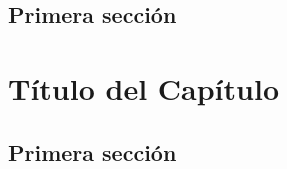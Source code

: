 \documentclass[12pt,a4paper,oneside,]{book}
\def\ifdoblecara{} %
\let\ifdoblecara\undefined %
\def\ifprincipal{} %
\numberwithin{dummy}{section}
\theoremstyle{ocrenumbox}
\theoremstyle{blacknumex}
\theoremstyle{blacknumbox}
\theoremstyle{ocrenum}
\theoremstyle{ocrenum}
\begin{document}
\hypertarget{primera-secciuxf3n-1}{%
\section{Primera sección}\label{primera-secciuxf3n-1}}

\FloatBarrier

\ifdefined\ifprincipal
\else
\setlength{\parindent}{1em}
\pagestyle{fancy}
\setcounter{tocdepth}{4}
\tableofcontents

\nocite{Luque2017,Luque2019,RStudio,R-base2,
R-knitr,R-rmarkdown,R-dplyr,R-ggplot2,Techopedia}

\fi

\ifdefined\ifdoblecara
\fancyhead{}{}
\fancyhead[LE,RO]{\scriptsize\rightmark}
\fancyfoot[LO,RE]{\scriptsize\slshape \leftmark}
\fancyfoot[C]{}
\fancyfoot[LE,RO]{\footnotesize\thepage}
\else
\fancyhead{}{}
\fancyhead[RO]{\scriptsize\rightmark}
\fancyfoot[LO]{\scriptsize\slshape \leftmark}
\fancyfoot[C]{}
\fancyfoot[RO]{\footnotesize\thepage}
\fi

\renewcommand{\headrulewidth}{0.4pt}
\renewcommand{\footrulewidth}{0.4pt}

\hypertarget{tuxedtulo-del-capuxedtulo-2}{%
\chapter{Título del Capítulo}\label{tuxedtulo-del-capuxedtulo-2}}

\hypertarget{primera-secciuxf3n-2}{%
\section{Primera sección}\label{primera-secciuxf3n-2}}

\FloatBarrier

\ifdefined\ifprincipal
\else
\setlength{\parindent}{1em}
\pagestyle{fancy}
\setcounter{tocdepth}{4}
\tableofcontents

\nocite{Luque2017,Luque2019,RStudio,R-base2,
R-knitr,R-rmarkdown,R-dplyr,R-ggplot2,Techopedia}

\fi

\ifdefined\ifdoblecara
\fancyhead{}{}
\fancyhead[LE,RO]{\scriptsize\rightmark}
\fancyfoot[LO,RE]{\scriptsize\slshape \leftmark}
\fancyfoot[C]{}
\fancyfoot[LE,RO]{\footnotesize\thepage}
\else
\fancyhead{}{}
\fancyhead[RO]{\scriptsize\rightmark}
\fancyfoot[LO]{\scriptsize\slshape \leftmark}
\fancyfoot[C]{}
\fancyfoot[RO]{\footnotesize\thepage}
\fi

\renewcommand{\headrulewidth}{0.4pt}
\renewcommand{\footrulewidth}{0.4pt}
\end{document}
